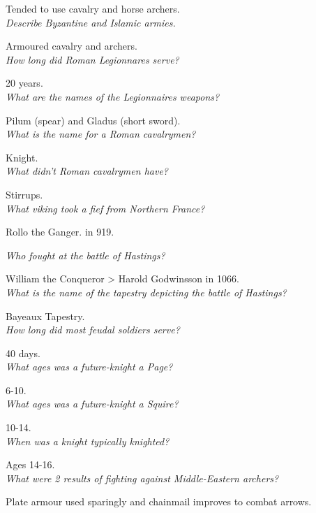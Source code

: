 \documentclass[12pt]{article}
\begin{document}
Tended to use cavalry and horse archers.\\

\textit{Describe Byzantine and Islamic armies.}

Armoured cavalry and archers.\\

\textit{How long did Roman Legionnares serve?}

20 years.\\

\textit{What are the names of the Legionnaires weapons?}

Pilum (spear) and Gladus (short sword).\\

\textit{What is the name for a Roman cavalrymen?}

Knight.\\

\textit{What didn't Roman cavalrymen have?}

Stirrups.\\

\textit{What viking took a fief from Northern France?}

Rollo the Ganger. in 919.

\textit{Who fought at the battle of Hastings?}

William the Conqueror > Harold Godwinsson in 1066.\\

\textit{What is the name of the tapestry depicting the battle of Hastings?}

Bayeaux Tapestry.\\

\textit{How long did most feudal soldiers serve?}

40 days.\\

\textit{What ages was a future-knight a Page?}

6-10.\\

\textit{What ages was a future-knight a Squire?}

10-14.\\

\textit{When was a knight typically knighted?}

Ages 14-16.\\

\textit{What were 2 results of fighting against Middle-Eastern archers?}

Plate armour used sparingly and chainmail improves to combat arrows.\\
\end{document}
